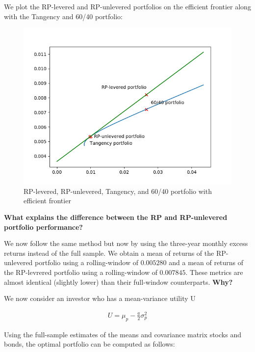 \documentclass[10pt]{article}
\newenvironment{exercise}[2][Exercise]{\begin{trivlist}
  \item[\hskip \labelsep {\bfseries #1}\hskip \labelsep {\bfseries #2.}]}{\end{trivlist}}
\begin{document}
\begin{exercise}{3}
	We plot the RP-levered and RP-unlevered portfolios on the efficient frontier along with the Tangency and 60/40 portfolio:
	
	\begin{figure}[H]
	
		\centering
		\includegraphics[scale=0.8]{figures/ex3.png}	
		\caption{RP-levered, RP-unlevered, Tangency, and 60/40 portfolio with efficient frontier}	
		\label{fig:ex3}
	
	\end{figure} 
	
	\textbf{What explains the difference between the RP and RP-unlevered portfolio performance?}
	
	\bigbreak	
	
	We now follow the same method but now by using the three-year monthly excess returns instead of the full sample. We obtain a mean of returns of the RP-unlevered portfolio using a rolling-window of $0.005280$ and a mean of returns of the RP-levrered portfolio using a rolling-window of $0.007845$. These metrics are almost identical (slightly lower) than their full-window counterparts. \textbf{Why?}
	
	\bigbreak
	
	We now consider an investor who has a mean-variance utility U
	
	\begin{align*}
		U = \mu_{p} - \frac{a}{2}\sigma^{2}_{p}
	\end{align*}
	
	Using the full-sample estimates of the means and covariance matrix stocks and bonds, the optimal portfolio can be computed as follows:
	

\end{exercise}
\end{document}
